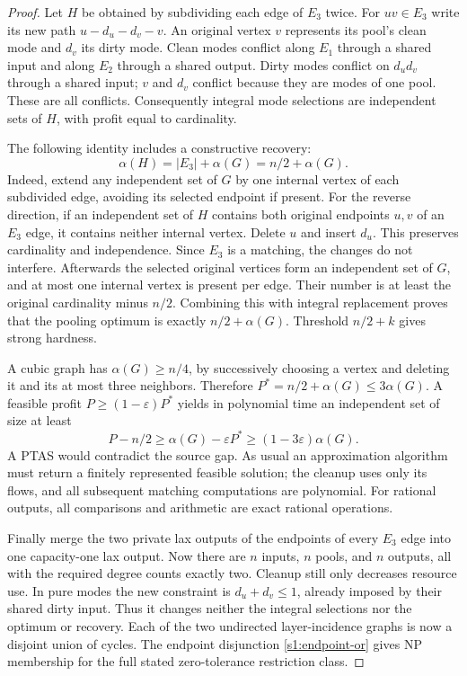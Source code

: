 \begin{proof}
Let $H$ be obtained by subdividing each edge of $E_3$ twice. For
$uv\in E_3$ write its new path $u-d_u-d_v-v$. An original vertex $v$
represents its pool's clean mode and $d_v$ its dirty mode. Clean modes
conflict along $E_1$ through a shared input and along $E_2$ through a
shared output. Dirty modes conflict on $d_ud_v$ through a shared input;
$v$ and $d_v$ conflict because they are modes of one pool. These are
all conflicts. Consequently integral mode selections are independent
sets of $H$, with profit equal to cardinality.

The following identity includes a constructive recovery:
\begin{equation}
 \alpha(H)=|E_3|+\alpha(G)=n/2+\alpha(G).\label{s3:is-identity}
\end{equation}
Indeed, extend any independent set of $G$ by one internal vertex of
each subdivided edge, avoiding its selected endpoint if present. For
the reverse direction, if an independent set of $H$ contains both
original endpoints $u,v$ of an $E_3$ edge, it contains neither internal
vertex. Delete $u$ and insert $d_u$. This preserves cardinality and
independence. Since $E_3$ is a matching, the changes do not interfere.
Afterwards the selected original vertices form an independent set of
$G$, and at most one internal vertex is present per edge. Their number
is at least the original cardinality minus $n/2$. Combining this with
integral replacement proves that the pooling optimum is exactly
$n/2+\alpha(G)$. Threshold $n/2+k$ gives strong hardness.

A cubic graph has $\alpha(G)\ge n/4$, by successively choosing a vertex
and deleting it and its at most three neighbors. Therefore
$P^*=n/2+\alpha(G)\le3\alpha(G)$. A feasible profit
$P\ge(1-\varepsilon)P^*$ yields in polynomial time an independent set
of size at least
\begin{equation}
 P-n/2\ge\alpha(G)-\varepsilon P^*
 \ge(1-3\varepsilon)\alpha(G).\label{s3:gap-transfer}
\end{equation}
A PTAS would contradict the source gap. As usual an approximation
algorithm must return a finitely represented feasible solution; the
cleanup uses only its flows, and all subsequent matching computations
are polynomial. For rational outputs, all comparisons and arithmetic
are exact rational operations.

Finally merge the two private lax outputs of the endpoints of every
$E_3$ edge into one capacity-one lax output. Now there are $n$ inputs,
$n$ pools, and $n$ outputs, all with the required degree counts exactly
two. Cleanup still only decreases resource use. In pure modes the new
constraint is $d_u+d_v\le1$, already imposed by their shared dirty input.
Thus it changes neither the integral selections nor the optimum or
recovery. Each of the two undirected layer-incidence graphs is now a
disjoint union of cycles. The endpoint disjunction
\eqref{s1:endpoint-or} gives NP membership for the full stated
zero-tolerance restriction class.
\end{proof}

